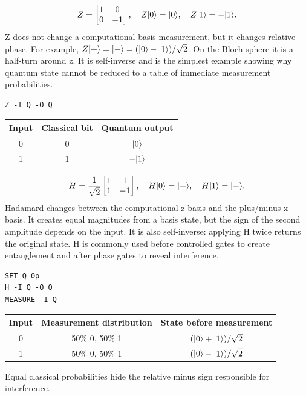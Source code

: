 
\[
Z=\begin{bmatrix}1&0\\0&-1\end{bmatrix},\quad
Z\lvert 0\rangle=\lvert 0\rangle,\quad Z\lvert 1\rangle=-\lvert 1\rangle.
\]
Z does not change a computational-basis measurement, but it changes relative
phase. For example, $Z\lvert +\rangle=\lvert -\rangle=(\lvert 0\rangle-\lvert 1\rangle)/\sqrt2$.
On the Bloch sphere it is a half-turn around z. It is self-inverse and is the
simplest example showing why quantum state cannot be reduced to a table of
immediate measurement probabilities.
\begin{lstlisting}
Z -I Q -O Q
\end{lstlisting}
\begin{center}
\begin{tabular}{ccc}\toprule Input & Classical bit & Quantum output\\\midrule
0 & 0 & $\lvert 0\rangle$\\
1 & 1 & $-\lvert 1\rangle$\\\bottomrule\end{tabular}
\end{center}


\[
H=\frac1{\sqrt2}\begin{bmatrix}1&1\\1&-1\end{bmatrix},\quad
H\lvert 0\rangle=\lvert +\rangle,\quad H\lvert 1\rangle=\lvert -\rangle.
\]
Hadamard changes between the computational z basis and the plus/minus x basis.
It creates equal magnitudes from a basis state, but the sign of the second
amplitude depends on the input. It is also self-inverse: applying H twice
returns the original state. H is commonly used before controlled gates to
create entanglement and after phase gates to reveal interference.
\begin{lstlisting}
SET Q 0p
H -I Q -O Q
MEASURE -I Q
\end{lstlisting}
\begin{center}
\begin{tabular}{ccc}\toprule Input & Measurement distribution & State before measurement\\\midrule
0 & 50\% 0, 50\% 1 & $(\lvert 0\rangle+\lvert 1\rangle)/\sqrt2$\\
1 & 50\% 0, 50\% 1 & $(\lvert 0\rangle-\lvert 1\rangle)/\sqrt2$\\\bottomrule\end{tabular}
\end{center}
Equal classical probabilities hide the relative minus sign responsible for
interference.

